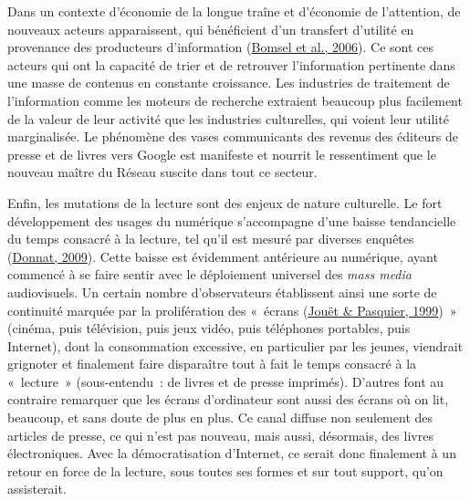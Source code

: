 \documentclass[12pt,french,letterpaper,]{article}
\begin{document}
Dans un contexte d'économie de la longue traîne et d'économie de
l'attention, de nouveaux acteurs apparaissent, qui bénéficient d'un
transfert d'utilité en provenance des producteurs d'information
(\protect\hyperlink{ref-bomsel_modem_2006}{Bomsel et al., 2006}). Ce
sont ces acteurs qui ont la capacité de trier et de retrouver
l'information pertinente dans une masse de contenus en constante
croissance. Les industries de traitement de l'information comme les
moteurs de recherche extraient beaucoup plus facilement de la valeur de
leur activité que les industries culturelles, qui voient leur utilité
marginalisée. Le phénomène des vases communicants des revenus des
éditeurs de presse et de livres vers Google est manifeste et nourrit le
ressentiment que le nouveau maître du Réseau suscite dans tout ce
secteur.

Enfin, les mutations de la lecture sont des enjeux de nature culturelle.
Le fort développement des usages du numérique s'accompagne d'une baisse
tendancielle du temps consacré à la lecture, tel qu'il est mesuré par
diverses enquêtes (\protect\hyperlink{ref-donnat_les_2009}{Donnat,
2009}). Cette baisse est évidemment antérieure au numérique, ayant
commencé à se faire sentir avec le déploiement universel des \emph{mass
media} audiovisuels. Un certain nombre d'observateurs établissent ainsi
une sorte de continuité marquée par la prolifération des «~écrans
(\protect\hyperlink{ref-jouet_les_1999}{Jouët \& Pasquier, 1999})~»
(cinéma, puis télévision, puis jeux vidéo, puis téléphones portables,
puis Internet), dont la consommation excessive, en particulier par les
jeunes, viendrait grignoter et finalement faire disparaître tout à fait
le temps consacré à la «~lecture~» (sous-entendu~: de livres et de
presse imprimés). D'autres font au contraire remarquer que les écrans
d'ordinateur sont aussi des écrans où on lit, beaucoup, et sans doute de
plus en plus. Ce canal diffuse non seulement des articles de presse, ce
qui n'est pas nouveau, mais aussi, désormais, des livres électroniques.
Avec la démocratisation d'Internet, ce serait donc finalement à un
retour en force de la lecture, sous toutes ses formes et sur tout
support, qu'on assisterait.
\end{document}
